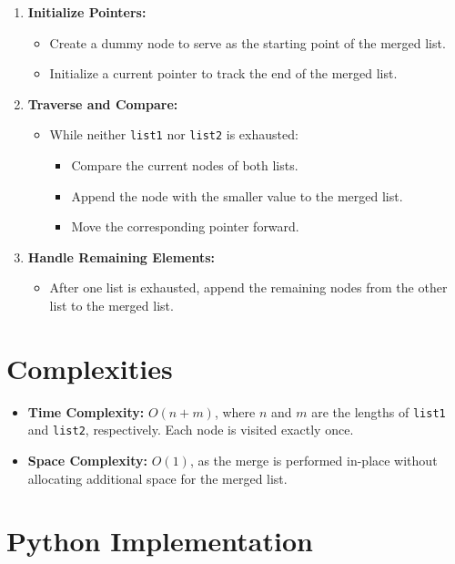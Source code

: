 \begin{enumerate}
    \item \textbf{Initialize Pointers:}
    \begin{itemize}
        \item Create a dummy node to serve as the starting point of the merged list.
        \item Initialize a current pointer to track the end of the merged list.
    \end{itemize}
    
    \item \textbf{Traverse and Compare:}
    \begin{itemize}
        \item While neither \texttt{list1} nor \texttt{list2} is exhausted:
        \begin{itemize}
            \item Compare the current nodes of both lists.
            \item Append the node with the smaller value to the merged list.
            \item Move the corresponding pointer forward.
        \end{itemize}
    \end{itemize}
    
    \item \textbf{Handle Remaining Elements:}
    \begin{itemize}
        \item After one list is exhausted, append the remaining nodes from the other list to the merged list.
    \end{itemize}
\end{enumerate}

\section*{Complexities}
\begin{itemize}
    \item \textbf{Time Complexity:} \(O(n + m)\), where \(n\) and \(m\) are the lengths of \texttt{list1} and \texttt{list2}, respectively. Each node is visited exactly once.
    \item \textbf{Space Complexity:} \(O(1)\), as the merge is performed in-place without allocating additional space for the merged list.
\end{itemize}

\section*{Python Implementation}

